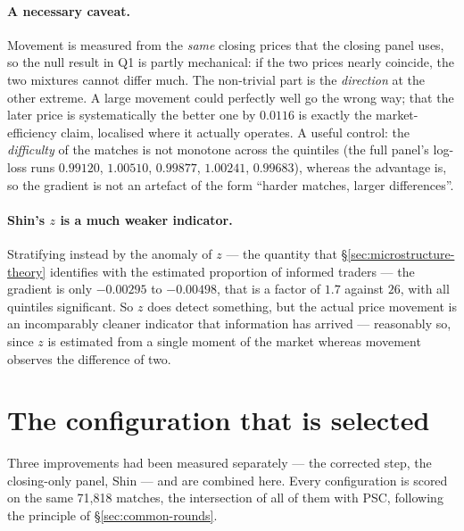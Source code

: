 \documentclass[12pt,a4paper,oneside]{report}
\renewcommand{\_}{\oldunderscore\allowbreak}
\theoremstyle{definition}
\theoremstyle{plain}
\theoremstyle{remark}
\begin{document}
\paragraph{A necessary caveat.} Movement is measured from the \emph{same} closing prices that the
closing panel uses, so the null result in Q1 is partly mechanical: if the two prices nearly
coincide, the two mixtures cannot differ much. The non-trivial part is the \emph{direction} at
the other extreme. A large movement could perfectly well go the wrong way; that the later price
is systematically the better one by $0.0116$ is exactly the market-efficiency claim, localised
where it actually operates. A useful control: the \emph{difficulty} of the matches is not
monotone across the quintiles (the full panel's log-loss runs $0.99120$, $1.00510$, $0.99877$,
$1.00241$, $0.99683$), whereas the advantage is, so the gradient is not an artefact of the form
``harder matches, larger differences''.

\paragraph{Shin's $z$ is a much weaker indicator.} Stratifying instead by the anomaly of $z$ ---
the quantity that \S\ref{sec:microstructure-theory} identifies with the estimated proportion of
informed traders --- the gradient is only $-0.00295$ to $-0.00498$, that is a factor of $1.7$
against $26$, with all quintiles significant. So $z$ does detect something, but the actual price
movement is an incomparably cleaner indicator that information has arrived --- reasonably so,
since $z$ is estimated from a single moment of the market whereas movement observes the
difference of two.

\section{The configuration that is selected}
\label{sec:res-config}

Three improvements had been measured separately --- the corrected step, the closing-only panel,
Shin --- and are combined here. Every configuration is scored on the same 71,818 matches, the
intersection of all of them with PSC, following the principle of \S\ref{sec:common-rounds}.
\end{document}
